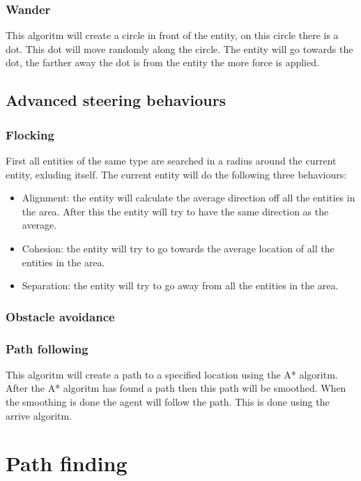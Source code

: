 \documentclass{article}
\begin{document}
   \subsubsection {Wander}
  This algoritm will create a circle in front of the entity, on this circle there is a dot. This dot will move randomly along the circle. The entity will go towards the dot, the farther away the dot is from the entity the more force is applied. 
  \subsection{Advanced steering behaviours}
  \subsubsection {Flocking}
  First all entities of the same type are searched in a radius around the current entity, exluding itself. The current entity will do the following three behaviours: 
  \begin{itemize}
  \item Alignment: the entity will calculate the average direction off all the entities in the area. After this the entity will try to have the same direction as the average.
  \item Cohesion: the entity will try to go towards the average location of all the entities in the area.
  \item Separation: the entity  will try to go away from all the entities in the area. 
  \end{itemize}
  \subsubsection {Obstacle avoidance}
  
  \subsubsection {Path following}
   This algoritm will create a path to a specified location using the A* algoritm. After the A* algoritm has found a path then this path will be smoothed. When the smoothing is done the agent will follow the path. This is done using the arrive algoritm. 
   \newpage
   
   \section {Path finding}
\end{document}
